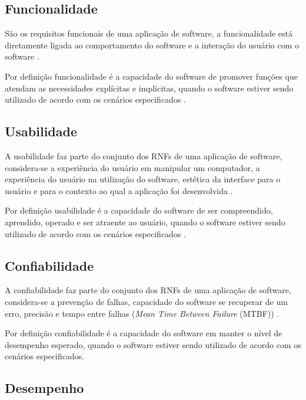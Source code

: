 \subsection{Funcionalidade}
\label{subsec:funcionalidade}

São os requisitos funcionais de uma aplicação de software, a funcionalidade está diretamente ligada ao comportamento do software e a interação do usuário com o software \cite{cintra2006implementaccao}.

Por definição funcionalidade é a capacidade do software de promover funções que atendam as necessidades explícitas e implícitas, quando o software estiver sendo utilizado de acordo com os cenários especificados \cite{qualidadeDeProdutoNBR}.

\subsection{Usabilidade}
\label{subsec:usabilidade}

A usabilidade faz parte do conjunto dos RNFs de uma aplicação de software, considera-se a experiência do usuário em manipular um computador, a experiência do usuário na utilização do software, estética da interface para o usuário e para o contexto ao qual a aplicação foi desenvolvida \cite{cintra2006implementaccao}.

Por definição usabilidade é a capacidade do software de ser compreendido, aprendido, operado e ser atraente ao usuário, quando o software estiver sendo utilizado de acordo com os cenários especificados \cite{qualidadeDeProdutoNBR}.


\subsection{Confiabilidade}
\label{subsec:confiabilidade}

A confiabilidade faz parte do conjunto dos RNFs de uma aplicação de software, considera-se a prevenção de falhas, capacidade do software se recuperar de um erro, precisão e tempo entre falhas (\textit{Mean Time Between Failure} (MTBF)) \cite{cintra2006implementaccao}.

Por definição confiabilidade é a capacidade do software em manter o nível de desempenho esperado, quando o software estiver sendo utilizado de acordo com os cenários especificados\cite{qualidadeDeProdutoNBR}.  

\subsection{Desempenho}
\label{subsec:desempenho}

